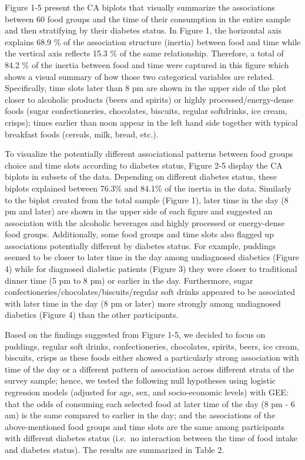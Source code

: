 \documentclass[utf8]{frontiersSCNS}
\begin{document}
Figure 1-5 present the CA biplots that visually summarize the
associations between 60 food groups and the time of their consumption in
the entire sample and then stratifying by their diabetes status. In
Figure 1, the horizontal axis explains 68.9 \% of the association
structure (inertia) between food and time while the vertical axis
reflects 15.3 \% of the same relationship. Therefore, a total of 84.2 \%
of the inertia between food and time were captured in this figure which
shows a visual summary of how those two categorical variables are
related. Specifically, time slots later than 8 pm are shown in the upper
side of the plot closer to alcoholic products (beers and spirits) or
highly processed/energy-dense foods (sugar confectioneries, chocolates,
biscuits, regular softdrinks, ice cream, crisps); times earlier than
noon appear in the left hand side together with typical breakfast foods
(cereals, milk, bread, etc.).

To visualize the potentially different associational patterns between
food groups choice and time slots according to diabetes status, Figure
2-5 display the CA biplots in subsets of the data. Depending on
different diabetes status, these biplots explained between 76.3\% and
84.1\% of the inertia in the data. Similarly to the biplot created from
the total sample (Figure 1), later time in the day (8 pm and later) are
shown in the upper side of each figure and suggested an association with
the alcoholic beverages and highly processed or energy-dense food
groups. Additionally, some food groups and time slots also flagged up
associations potentially different by diabetes status. For example,
puddings seemed to be closer to later time in the day among undiagnosed
diabetics (Figure 4) while for diagnosed diabetic patients (Figure 3)
they were closer to traditional dinner time (5 pm to 8 pm) or earlier in
the day. Furthermore, sugar confectioneries/chocolates/biscuits/regular
soft drinks appeared to be associated with later time in the day (8 pm
or later) more strongly among undiagnosed diabetics (Figure 4) than the
other participants.

Based on the findings suggested from Figure 1-5, we decided to focus on
puddings, regular soft drinks, confectioneries, chocolates, spirits,
beers, ice cream, biscuits, crisps as these foods either showed a
particularly strong association with time of the day or a different
pattern of association across different strata of the survey sample;
hence, we tested the following null hypotheses using logistic regression
models (adjusted for age, sex, and socio-economic levels) with GEE: that
the odds of consuming each selected food at later time of the day (8 pm
- 6 am) is the same compared to earlier in the day; and the associations
of the above-mentioned food groups and time slots are the same among
participants with different diabetes status (i.e.~no interaction between
the time of food intake and diabetes status). The results are summarized
in Table 2.
\end{document}
